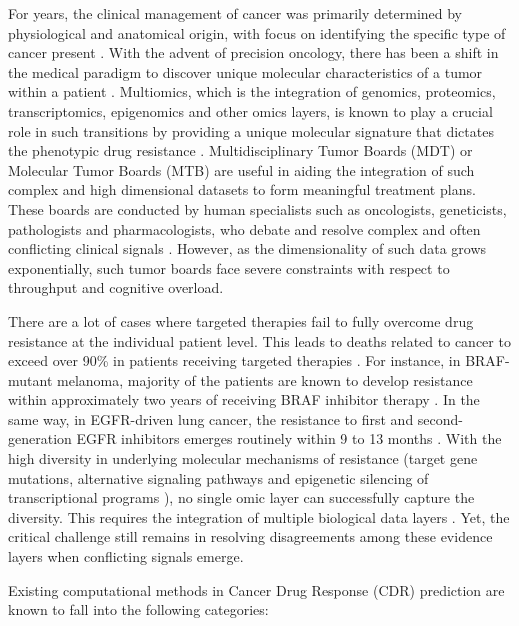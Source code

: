 \documentclass{article}
\begin{document}
For years, the clinical management of cancer was primarily determined by physiological and anatomical origin, with focus on identifying the specific type of cancer present \cite{hein2025ai, liu2025multiomics}. With the advent of precision oncology, there has been a shift in the medical paradigm to discover unique molecular characteristics of a tumor within a patient \cite{hein2025ai}. Multiomics, which is the integration of genomics, proteomics, transcriptomics, epigenomics and other omics layers, is known to play a crucial role in such transitions by providing a unique molecular signature that dictates the phenotypic drug resistance \cite{du2024advances}. Multidisciplinary Tumor Boards (MDT) or Molecular Tumor Boards (MTB) are useful in aiding the integration of such complex and high dimensional datasets to form meaningful treatment plans. These boards are conducted by human specialists such as oncologists, geneticists, pathologists and pharmacologists, who debate and resolve complex and often conflicting clinical signals \cite{han2025multiagent, lorenzo2026evaluation}. However, as the dimensionality of such data grows exponentially, such tumor boards face severe constraints with respect to throughput and cognitive overload.

There are a lot of cases where targeted therapies fail to fully overcome drug resistance at the individual patient level. This leads to deaths related to cancer to exceed over 90\% in patients receiving targeted therapies \cite{mao2025emerging}. For instance, in BRAF-mutant melanoma, majority of the patients are known to develop resistance within approximately two years of receiving BRAF inhibitor therapy \cite{proietti2020mechanisms}. In the same way, in EGFR-driven lung cancer, the resistance to first and second-generation EGFR inhibitors emerges routinely within 9 to 13 months \cite{rotow2017understanding}. With the high diversity in underlying molecular mechanisms of resistance (target gene mutations, alternative signaling pathways and epigenetic silencing of transcriptional programs \cite{housman2014drug}), no single omic layer can successfully capture the diversity. This requires the integration of multiple biological data layers \cite{liu2025multiomics}. Yet, the critical challenge still remains in resolving disagreements among these evidence layers when conflicting signals emerge.    

Existing computational methods in Cancer Drug Response (CDR) prediction are known to fall into the following categories:
\end{document}
